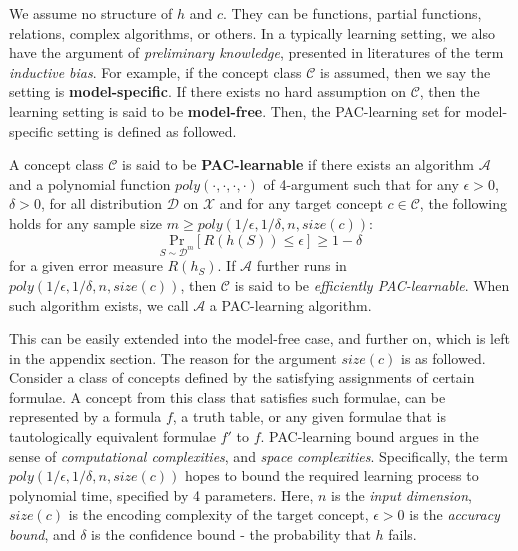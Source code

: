 \documentclass[10pt]{article} %
\begin{document}
We assume no structure of $h$ and $c$. They can be functions, partial functions, relations, complex algorithms, or others. In a typically learning setting, we also have the argument of \textit{preliminary knowledge}, presented in literatures of the term \textit{inductive bias}. For example, if the concept class $\mathcal{C}$ is assumed, then we say the setting is \textbf{model-specific}. If there exists no hard assumption on $\mathcal{C}$, then the learning setting is said to be \textbf{model-free}. Then, the PAC-learning set for model-specific setting is defined as followed. 

\begin{definition}
    A concept class $\mathcal{C}$ is said to be \textbf{PAC-learnable} if there exists an algorithm $\mathcal{A}$ and a polynomial function $poly(\cdot,\cdot,\cdot,\cdot)$ of 4-argument such that for any $\epsilon>0$, $\delta>0$, for all distribution $\mathcal{D}$ on $\mathcal{X}$ and for any target concept $c\in\mathcal{C}$, the following holds for any sample size $m\geq poly(1/\epsilon,1/\delta,n,size(c))$: $$\underset{S\sim \mathcal{D}^{m}}{\mathrm{Pr}}\left[ R(h(S))\leq \epsilon \right]\geq 1-\delta$$
    for a given error measure $R(h_{S})$. If $\mathcal{A}$ further runs in $poly(1/\epsilon,1/\delta,n,size(c))$, then $\mathcal{C}$ is said to be \textit{efficiently PAC-learnable}. When such algorithm exists, we call $\mathcal{A}$ a PAC-learning algorithm. 
\end{definition}
This can be easily extended into the model-free case, and further on, which is left in the appendix section. The reason for the argument $size(c)$ is as followed. Consider a class of concepts defined by the satisfying assignments of certain formulae. A concept from this class that satisfies such formulae, can be represented by a formula $f$, a truth table, or any given formulae that is tautologically equivalent formulae $f'$ to $f$. PAC-learning bound argues in the sense of \textit{computational complexities}, and \textit{space complexities}. Specifically, the term $poly(1/\epsilon,1/\delta,n,size(c))$ hopes to bound the required learning process to polynomial time, specified by 4 parameters. Here, $n$ is the \textit{input dimension}, $size(c)$ is the encoding complexity of the target concept, $\epsilon>0$ is the \textit{accuracy bound}, and $\delta$ is the confidence bound - the probability that $h$ fails.
\end{document}
